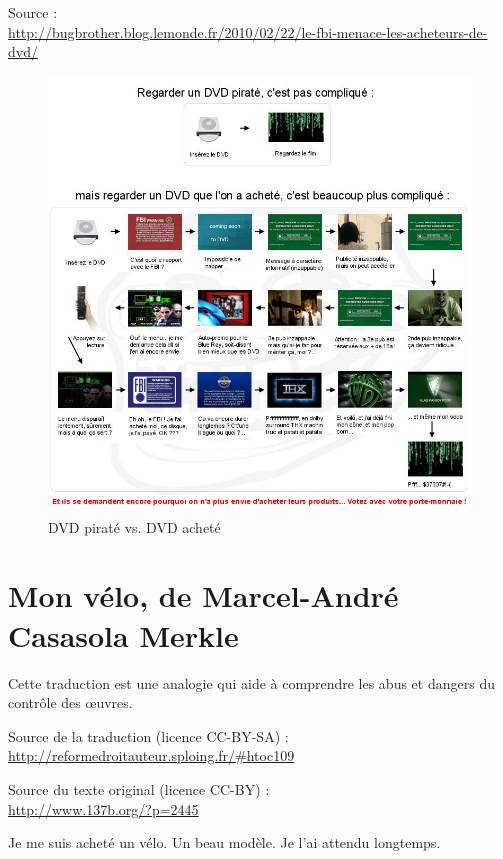 Source :\\
\url{http://bugbrother.blog.lemonde.fr/2010/02/22/le-fbi-menace-les-acheteurs-de-dvd/}

\newpage

\begin{figure}[H]
\center
\includegraphics[width=\textwidth]{images/dvd-legal-dvd-illegal.jpg}
\caption{DVD piraté vs. DVD acheté}
\end{figure}

\chapter{Mon vélo, de Marcel-André Casasola Merkle}
\label{annexe-velo}

Cette traduction est une analogie qui aide à comprendre les abus et dangers du contrôle des œuvres.

Source de la traduction (licence CC-BY-SA) :\\
\url{http://reformedroitauteur.sploing.fr/\#htoc109}

Source du texte original (licence CC-BY) :\\
\url{http://www.137b.org/?p=2445}

\newpage

Je me suis acheté un vélo. Un beau modèle. Je l’ai attendu longtemps.

